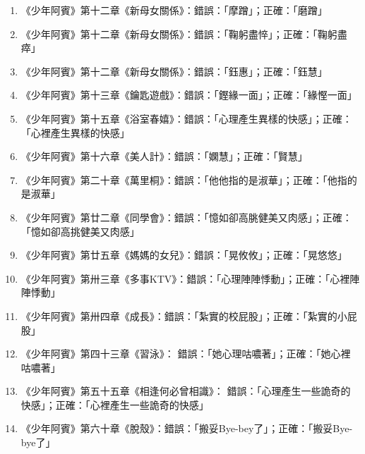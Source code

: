 \begin{enumerate}
\item 《少年阿賓》第十二章《新母女關係》：錯誤：「摩蹭」；正確：「磨蹭」
\item 《少年阿賓》第十二章《新母女關係》：錯誤：「鞠躬盡悴」；正確：「鞠躬盡瘁」
\item 《少年阿賓》第十二章《新母女關係》：錯誤：「鈺惠」；正確：「鈺慧」
\item 《少年阿賓》第十三章《鑰匙遊戲》：錯誤：「鏗緣一面」；正確：「緣慳一面」
\item 《少年阿賓》第十五章《浴室春嬉》：錯誤：「心理產生異樣的快感」；正確：「心裡產生異樣的快感」
\item 《少年阿賓》第十六章《美人計》：錯誤：「嫻慧」；正確：「賢慧」
\item 《少年阿賓》第二十章《萬里桐》：錯誤：「他他指的是淑華」；正確：「他指的是淑華」
\item 《少年阿賓》第廿二章《同學會》：錯誤：「憶如卻高朓健美又肉感」；正確：「憶如卻高挑健美又肉感」
\item 《少年阿賓》第廿五章《媽媽的女兒》：錯誤：「晃攸攸」；正確：「晃悠悠」
\item 《少年阿賓》第卅三章《多事KTV》：錯誤：「心理陣陣悸動」；正確：「心裡陣陣悸動」
\item 《少年阿賓》第卅四章《成長》：錯誤：「紮實的校屁股」；正確：「紮實的小屁股」
\item 《少年阿賓》第四十三章《習泳》： 錯誤：「她心理咕噥著」；正確：「她心裡咕噥著」
\item 《少年阿賓》第五十五章《相逢何必曾相識》： 錯誤：「心理產生一些詭奇的快感」；正確：「心裡產生一些詭奇的快感」
\item 《少年阿賓》第六十章《脫殼》：錯誤：「搬妥Bye-bey了」；正確：「搬妥Bye-bye了」
\end{enumerate}
